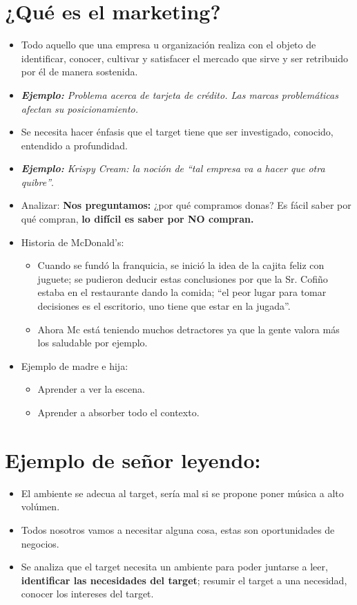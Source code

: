 \section{¿Qué es el marketing?}
\begin{itemize}
    \item Todo aquello que una empresa u organización realiza con el objeto de identificar, conocer, cultivar y satisfacer el mercado que sirve y ser retribuido por él de manera sostenida.
    \item \emph{\textbf{Ejemplo: }Problema acerca de tarjeta de crédito. Las marcas problemáticas afectan su posicionamiento.}
    \item Se necesita hacer énfasis que el target tiene que ser investigado, conocido, entendido a profundidad.
    \item \emph{\textbf{Ejemplo: }Krispy Cream: la noción de ``tal empresa va a hacer que otra quibre''}.
    \item Analizar: \textbf{Nos preguntamos:} ¿por qué compramos donas? Es fácil saber por qué compran, \textbf{lo difícil es saber por NO compran.}
    \item Historia de McDonald's: 
        \begin{itemize}
            \item Cuando se fundó la franquicia, se inició la idea de la cajita feliz con juguete; se pudieron deducir estas conclusiones por que la Sr. Cofiño estaba en el restaurante dando la comida; ``el peor lugar para tomar decisiones es el escritorio, uno tiene que estar en la jugada''.
            \item Ahora Mc está teniendo muchos detractores ya que la gente valora más los saludable por ejemplo. 
        \end{itemize}    
    \item Ejemplo de madre e hija:
        \begin{itemize}
            \item Aprender a ver la escena.
            \item Aprender a absorber todo el contexto.
        \end{itemize}
\end{itemize}

\section{Ejemplo de señor leyendo:}
\begin{itemize}
    \item El ambiente se adecua al target, sería mal si se propone poner música a alto volúmen.
    \item Todos nosotros vamos a necesitar alguna cosa, estas son oportunidades de negocios.
    \item Se analiza que el target necesita un ambiente para poder juntarse a leer, \textbf{identificar las necesidades del target}; resumir el target a una necesidad, conocer los intereses del target.  
\end{itemize}

